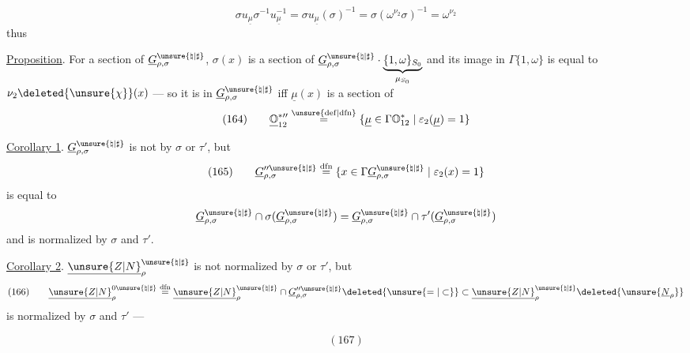 
\[
\sigma u_{\underline\mu}\sigma^{-1}u_{\underline\mu}^{-1}
=\sigma u_{\underline\mu}(\sigma)^{-1}
=\sigma(\omega^{\nu_2}\sigma)^{-1}=\omega^{\nu_2}
\]
thus

\uline{Proposition}. For a section  of $\underline G_{\rho,\sigma}^{\unsure{\natural|\sharp}}$, \deleted{$\unsure{\sigma}$}
$\sigma(x)$ is a section of $\underline G_{\rho,\sigma}^{\unsure{\natural|\sharp}}\cdot\underbrace{\{1,\omega\}_{S_0}}_{\mu_{S_0}}$ and its image in $\Gamma\{1,\omega\}$ is equal to $\nu_2\deleted{\unsure{\chi}}(x)$ --- so it is in $\underline G_{\rho,\sigma}^{\unsure{\natural|\sharp}}$ iff $\underline\mu(x)$ is a section of
\[
(164)\qquad
\underline{\mathbb O}_{12}^{*\prime\prime}
\overset{\unsure{\mathrm{def}|\mathrm{dfn}}}{=}
\{\underline\mu\in\Gamma\mathbb O_{12}^*\mid\varepsilon_2(\underline\mu)=1\}
\]

\uline{Corollary 1}. $\underline G_{\rho,\sigma}^{\unsure{\natural|\sharp}}$ is not  by $\sigma$ or $\tau'$, but
\[
(165)\qquad
\underline G_{\rho,\sigma}^{\prime\prime\unsure{\natural|\sharp}}
\overset{\mathrm{dfn}}{=}
\{x\in\Gamma\underline G_{\rho,\sigma}^{\unsure{\natural|\sharp}}\mid\varepsilon_2(x)=1\}
\]
is equal to
\[
\underline G_{\rho,\sigma}^{\unsure{\natural|\sharp}}
\cap\sigma(\underline G_{\rho,\sigma}^{\unsure{\natural|\sharp}})
=\underline G_{\rho,\sigma}^{\unsure{\natural|\sharp}}
\cap\tau'(\underline G_{\rho,\sigma}^{\unsure{\natural|\sharp}})
\]
and is normalized by $\sigma$ and $\tau'$.

\uline{Corollary 2}. $\underline{\unsure{Z|N}}_\rho^{\unsure{\natural|\sharp}}$ is not normalized by $\sigma$ or $\tau'$, but
\[
(166)\qquad
\underline{\unsure{Z|N}}_\rho^{0\unsure{\natural|\sharp}}
\overset{\mathrm{dfn}}{=}
\underline{\unsure{Z|N}}_\rho^{\unsure{\natural|\sharp}}
\cap\underline G_{\rho,\sigma}^{\prime\prime\unsure{\natural|\sharp}}
\deleted{\unsure{=|\subset}}
\subset\underline{\unsure{Z|N}}_\rho^{\unsure{\natural|\sharp}}
\deleted{\unsure{\underline N_\rho}}
\]
is normalized by $\sigma$ and $\tau'$ --- 
\begin{samepage}
\[
(167)
\]
\end{samepage}

